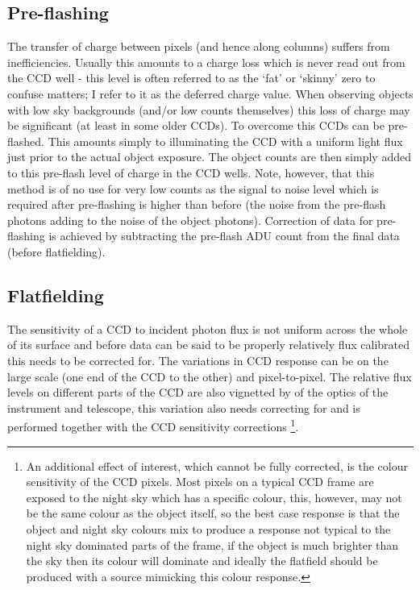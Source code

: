 \documentclass[twoside,11pt]{article}
\newcommand{\xlabel}[1]{}
\renewcommand{\_}{\texttt{\symbol{95}}}
\begin{document}
\subsection{Pre-flashing\xlabel{CCDglospreflash}}
The transfer of charge between pixels (and hence along columns) suffers
from inefficiencies. Usually this amounts to a charge loss which is
never read out from the CCD well - this level is often referred to as
the `fat' or `skinny' zero to confuse matters; I refer to it as the
deferred charge value. When observing objects with low sky backgrounds
(and/or low counts themselves) this loss of charge may be significant
(at least in some older CCDs). To overcome this CCDs can be pre-flashed.
This amounts simply to illuminating the CCD with a uniform light flux
just prior to the actual object exposure. The object counts are then
simply added to this pre-flash level of charge in the CCD wells. Note,
however, that this method is of no use for very low counts as the signal
to noise level which is required after pre-flashing is higher than
before (the noise from the pre-flash photons adding to the noise of the
object photons). Correction of data for pre-flashing is achieved by
subtracting the pre-flash ADU count from the final data (before
flatfielding).

\subsection{Flatfielding\xlabel{CCDglosflatfielding}}
The sensitivity of a CCD to incident photon flux is not uniform across
the whole of its surface and before data can be said to be properly
relatively flux calibrated this needs to be corrected for. The
variations in CCD response can be on the large scale (one end of the CCD
to the other) and pixel-to-pixel. The relative flux levels on different
parts of the CCD are also vignetted by of the optics of the instrument
and telescope, this variation also needs correcting for and is performed
together with the CCD sensitivity corrections \footnote {An additional
effect of interest, which cannot be fully corrected, is the colour
sensitivity of the CCD pixels. Most pixels on a typical CCD frame are
exposed to the night sky which has a specific colour, this, however, may
not be the same colour as the object itself, so the best case response
is that the object and night sky colours mix to produce a response not
typical to the night sky dominated parts of the frame, if the object is
much brighter than the sky then its colour will dominate and ideally the
flatfield should be produced with a source mimicking this colour
response.}.
\end{document}
